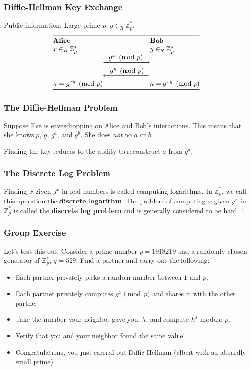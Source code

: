 \documentclass{beamer}
\newcommand{\<}{\langle}
\renewcommand{\>}{\rangle}
\newcommand{\Z}{\mathbb{Z}}
\begin{document}
\begin{frame}
\frametitle{Diffie-Hellman Key Exchange}
Public information: Large prime $p$, $g\in_R\Z_p^*$.
\[
\begin{array}{@{}l@{}c@{}l@{}}
\toprule
\textbf{Alice} && \textbf{Bob} \\

x \in_R \Z_p^*&& y \in_R \Z_p^*\\

& \xrightarrow{\textstyle  \text{   }\text{ }  g^x\pmod p  \text{   }\text{ } } \\

& \xleftarrow {\textstyle \text{   }\text{ }  g^y \pmod p \text{ }  \text{ } } \\

\kappa = g^{xy} \pmod p && \kappa = g^{xy} \pmod p \\
\bottomrule
\end{array}
\]
\end{frame}


\begin{frame}
\frametitle{The Diffie-Hellman Problem}

Suppose Eve is eavesdropping on Alice and Bob's interactions. This means that she knows $p$, $g$, $g^a$, and $g^b$. She does \emph{not} no $a$ or $b$.\newline

Finding the key reduces to the ability to reconstruct $a$ from $g^a$.
\end{frame}


\begin{frame}
\frametitle{The Discrete Log Problem}

Finding $x$ given $g^x$ in real numbers is called computing logarithms. In $\Z_p^*$, we call this operation the \textbf{discrete logarithm}.  The problem of computing $x$ given $g^x$ in $\Z_p^*$ is called the \textbf{discrete log problem} and is generally considered to be hard. `
\end{frame}


\begin{frame}
\frametitle{Group Exercise}

Let's test this out. Consider a prime number $p=1918219$ and a randomly chosen generator of $\Z_p^*$, $g = 529$. Find a partner and carry out the following:
\begin{itemize}
\item Each partner privately picks a random number between $1$ and $p$.
\item Each partner privately computes $g^x\pmod p$ and shares it with the other partner 
\item Take the number your neighbor gave you, $h$, and compute $h^x$ modulo $p$.
\item Verify that you and your neighbor found the same value! 
\item Congratulations, you just carried out Diffie-Hellman (albeit with an absurdly small prime)
\end{itemize}
\end{frame}
\end{document}
